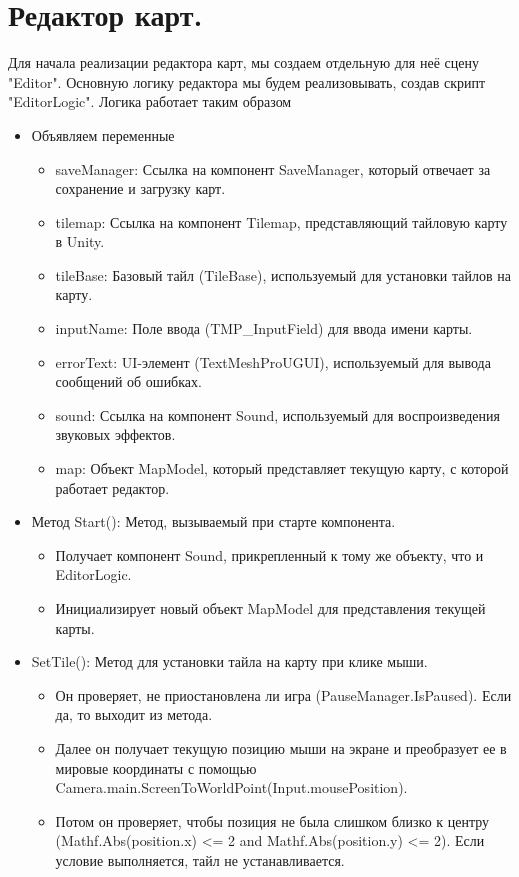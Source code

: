 \section{Редактор карт.}
Для начала реализации редактора карт, мы создаем отдельную для неё сцену "Editor".
Основную логику редактора мы будем реализовывать, создав скрипт "EditorLogic". Логика работает таким образом
\begin{itemize}
    \item Объявляем переменные
    \begin{itemize}
        \item saveManager: Ссылка на компонент SaveManager, который отвечает за сохранение и загрузку карт.
        \item tilemap: Ссылка на компонент Tilemap, представляющий тайловую карту в Unity.
        \item tileBase: Базовый тайл (TileBase), используемый для установки тайлов на карту.
        \item inputName: Поле ввода (TMP\_InputField) для ввода имени карты.
        \item errorText: UI-элемент (TextMeshProUGUI), используемый для вывода сообщений об ошибках.
        \item sound: Ссылка на компонент Sound, используемый для воспроизведения звуковых эффектов.
        \item map: Объект MapModel, который представляет текущую карту, с которой работает редактор.
    \end{itemize}
    \item Метод Start(): Метод, вызываемый при старте компонента. 
    \begin{itemize}
    \item Получает компонент Sound, прикрепленный к тому же объекту, что и EditorLogic. 
    \item Инициализирует новый объект MapModel для представления текущей карты.
    \end{itemize}
    \item SetTile(): Метод для установки тайла на карту при клике мыши. 
    \begin{itemize}
        \item Он проверяет, не приостановлена ли игра (PauseManager.IsPaused). Если да, то выходит из метода.
        \item Далее он получает текущую позицию мыши на экране и преобразует ее в мировые координаты с помощью Camera.main.ScreenToWorldPoint(Input.mousePosition).
        \item Потом он проверяет, чтобы позиция не была слишком близко к центру (Mathf.Abs(position.x) <= 2 and Mathf.Abs(position.y) <= 2). Если условие выполняется, тайл не устанавливается.

\end{itemize}
\end{itemize}
